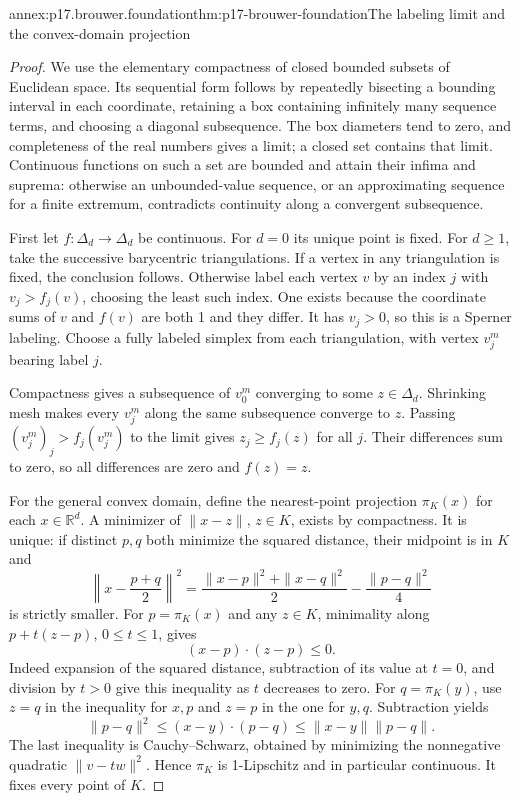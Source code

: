 \begin{annexitem}{annex:p17.brouwer.foundation}{thm:p17-brouwer-foundation}{The labeling limit and the convex-domain projection}
\begin{proof}
We use the elementary compactness of closed bounded
subsets of Euclidean space. Its sequential form
follows by repeatedly bisecting a bounding interval
in each coordinate, retaining a box containing
infinitely many sequence terms, and choosing a
diagonal subsequence. The box diameters tend to
zero, and completeness of the real numbers gives
a limit; a closed set contains that limit.
Continuous functions on such a set are bounded
and attain their infima and suprema: otherwise
an unbounded-value sequence, or an approximating
sequence for a finite extremum, contradicts
continuity along a convergent subsequence.

First let \(f:\Delta_d\to\Delta_d\) be continuous.
For \(d=0\) its unique point is fixed.
For \(d\geq1\), take the successive barycentric
triangulations. If a vertex in any triangulation
is fixed, the conclusion follows. Otherwise
label each vertex \(v\) by an index \(j\) with
\(v_j>f_j(v)\), choosing the least such index.
One exists because the coordinate sums of
\(v\) and \(f(v)\) are both 1 and they differ.
It has \(v_j>0\), so this is a Sperner labeling.
Choose a fully labeled simplex from each
triangulation, with vertex \(v_j^m\) bearing
label \(j\).

Compactness gives a subsequence of \(v_0^m\)
converging to some \(z\in\Delta_d\). Shrinking
mesh makes every \(v_j^m\) along the same
subsequence converge to \(z\).
Passing \((v_j^m)_j>f_j(v_j^m)\) to the
limit gives \(z_j\geq f_j(z)\) for all \(j\).
Their differences sum to zero, so all
differences are zero and \(f(z)=z\).

For the general convex domain, define the
nearest-point projection \(\pi_K(x)\) for
each \(x\in\mathbb R^d\). A minimizer of
\(\|x-z\|\), \(z\in K\), exists by compactness.
It is unique: if distinct \(p,q\) both
minimize the squared distance, their midpoint
is in \(K\) and
\[
 \left\|x-\frac{p+q}{2}\right\|^2
   =\frac{\|x-p\|^2+\|x-q\|^2}{2}-\frac{\|p-q\|^2}{4}
\]
is strictly smaller. For \(p=\pi_K(x)\) and
any \(z\in K\), minimality along
\(p+t(z-p)\), \(0\leq t\leq1\), gives
\[
                         (x-p)\cdot(z-p)\leq0.
\]
Indeed expansion of the squared distance,
subtraction of its value at \(t=0\), and
division by \(t>0\) give this inequality
as \(t\) decreases to zero.
For \(q=\pi_K(y)\), use \(z=q\) in the
inequality for \(x,p\) and \(z=p\) in
the one for \(y,q\). Subtraction yields
\[
                \|p-q\|^2\leq(x-y)\cdot(p-q)
                                   \leq\|x-y\|\|p-q\|.
\]
The last inequality is Cauchy--Schwarz,
obtained by minimizing the nonnegative
quadratic \(\|v-tw\|^2\).
Hence \(\pi_K\) is 1-Lipschitz and in
particular continuous. It fixes every point
of \(K\).


\end{proof}
\end{annexitem}
